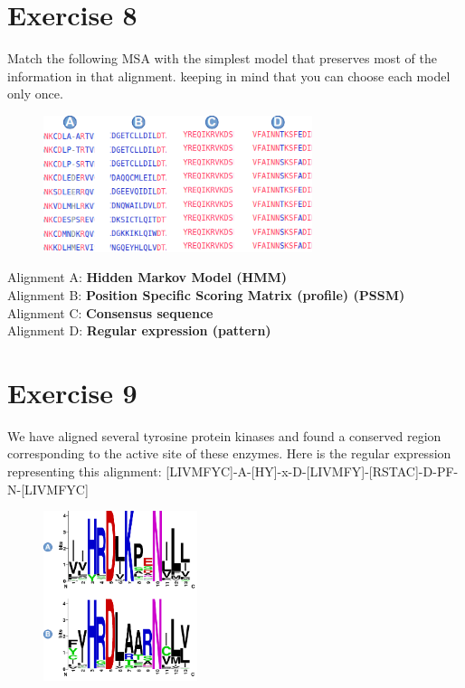 \section{Exercise 8}
Match the following MSA with the simplest model that preserves most of the information in that alignment. keeping in mind that you can choose each model only once.
\begin{figure}[htbp]
\centering
\includegraphics[width = 0.7\textwidth]{figs/exam-ex8.png}
\end{figure}

\noindent
Alignment A: \textbf{Hidden Markov Model (HMM)} \\
Alignment B: \textbf{Position Specific Scoring Matrix (profile) (PSSM)} \\
Alignment C: \textbf{Consensus sequence} \\
Alignment D: \textbf{Regular expression (pattern)}

\section{Exercise 9}
We have aligned several tyrosine protein kinases and found a conserved region corresponding to the active site of these enzymes. Here is the regular expression representing this alignment: [LIVMFYC]-{A}-[HY]-x-D-[LIVMFY]-[RSTAC]-{D}-{PF}-N-[LIVMFYC] 

\begin{figure}[htbp]
\centering
\includegraphics[width = 0.4\textwidth]{figs/exam-ex9.png}
\end{figure}

